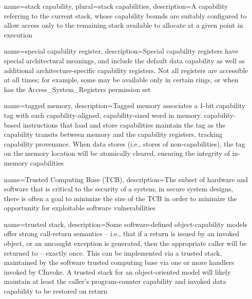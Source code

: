 {
  name=stack capability,
  plural=stack capabilities,
  description={A \gls{capability} referring to the current stack, whose
    \gls{capability bounds} are suitably configured to allow access only to
    the remaining stack available to allocate at a given point in execution}
}

{
  name=special capability register,
  description={Special capability registers have special architectural
    meanings, and include the \gls{default data capability} as well
    as additional architecture-specific capability registers.
    Not all registers are accessible at all times; for example, some may be
    available only in certain rings, or when \PCC{} has the
    Access\_System\_Registers permission set}
}

{
  name=tagged memory,
  description={Tagged memory associates a 1-bit \gls{capability tag} with
    each \gls{capability}-aligned, capability-sized word in memory.
    \Gls{capability-based instructions} that load and store capabilities
    maintain the tag as the capability transits between memory and the
    \glspl{capability register}, tracking \gls{capability provenance}.
    When data stores (i.e., stores of non-capabilities), the tag on the
    memory location will be atomically cleared, ensuring the integrity of
    in-memory capabilities}
}

{
  name=Trusted Computing Base (TCB),
  description={The subset of hardware and software that is critical to the
    security of a system;
    in secure system designs, there is often a goal to minimize the size of
    the TCB in order to minimize the opportunity for exploitable software
    vulnerabilities}
}

{
  name=trusted stack,
  description={Some software-defined object-capability models offer strong
    call-return semantics -- i.e., that if a return is issued by an invoked
    object, or an uncaught exception is generated, then the appropriate caller
    will be returned to -- exactly once.
    This can be implemented via a trusted stack, maintained by the software
    \gls{trusted computing base} via one or more handlers invoked by \gls{CInvoke}.
    A trusted stack for an object-oriented model will likely maintain at least
    the caller's \gls{program-counter capability} and \gls{invoked data
    capability} to be restored on return}
}

